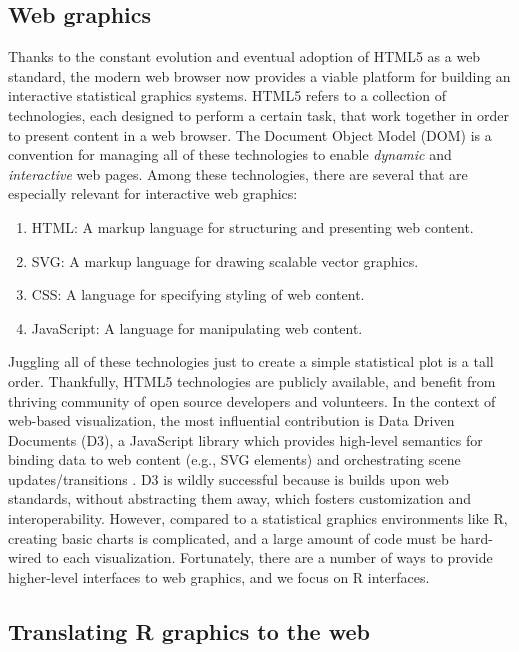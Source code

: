 \documentclass[11pt]{isuthesis}
\providecommand{\tightlist}{%
  \setlength{\itemsep}{0pt}\setlength{\parskip}{0pt}}
\begin{document}
\subsection{Web graphics}\label{web-graphics}

Thanks to the constant evolution and eventual adoption of HTML5 as a web
standard, the modern web browser now provides a viable platform for
building an interactive statistical graphics systems. HTML5 refers to a
collection of technologies, each designed to perform a certain task,
that work together in order to present content in a web browser. The
Document Object Model (DOM) is a convention for managing all of these
technologies to enable \emph{dynamic} and \emph{interactive} web pages.
Among these technologies, there are several that are especially relevant
for interactive web graphics:

\begin{enumerate}
\def\labelenumi{\arabic{enumi}.}
\tightlist
\item
  HTML: A markup language for structuring and presenting web content.
\item
  SVG: A markup language for drawing scalable vector graphics.
\item
  CSS: A language for specifying styling of web content.
\item
  JavaScript: A language for manipulating web content.
\end{enumerate}

Juggling all of these technologies just to create a simple statistical
plot is a tall order. Thankfully, HTML5 technologies are publicly
available, and benefit from thriving community of open source developers
and volunteers. In the context of web-based visualization, the most
influential contribution is Data Driven Documents (D3), a JavaScript
library which provides high-level semantics for binding data to web
content (e.g., SVG elements) and orchestrating scene updates/transitions
\citep{Bostock:2011}. D3 is wildly successful because is builds upon web
standards, without abstracting them away, which fosters customization
and interoperability. However, compared to a statistical graphics
environments like R, creating basic charts is complicated, and a large
amount of code must be hard-wired to each visualization. Fortunately,
there are a number of ways to provide higher-level interfaces to web
graphics, and we focus on R interfaces.

\subsection{Translating R graphics to the
web}\label{translating-r-graphics-to-the-web}
\end{document}
